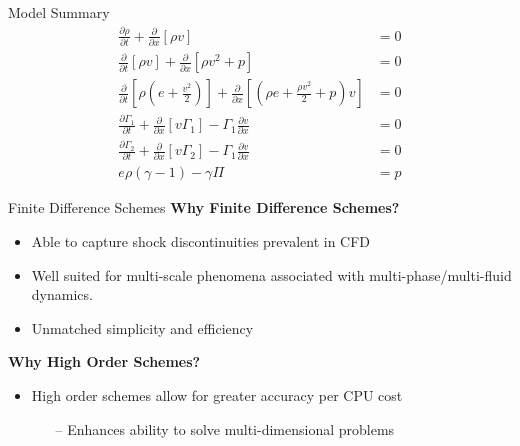 \documentclass[10pt]{beamer}
\begin{document}
\begin{frame}{Model Summary}
  \begin{align}
    \frac{\partial \rho}{\partial t}+\frac{\partial}{\partial x}[\rho v] &=0\label{eq:MassBalance}\\
    \frac{\partial}{\partial t}[\rho v]+\frac{\partial}{\partial x}[\rho v^2+p]&=0\label{eq:MomentaBalance}\\
    \frac{\partial}{\partial t}[\rho(e+\tfrac{v^2}{2})]+\frac{\partial}{\partial x}[(\rho e+\tfrac{\rho v^2}{2} +p)v]&=0\label{eq:EnergyBalance}\\
    \frac{\partial \Gamma_1 }{\partial t} + \frac{\partial}{\partial x}[v\Gamma_1] - \Gamma_1 \frac{\partial v}{\partial x}&=0\label{eq: Order Parameter One}\\
    \frac{\partial \Gamma_2 }{\partial t} + \frac{\partial}{\partial x}[v\Gamma_2] - \Gamma_1 \frac{\partial v}{\partial x}&=0\label{eq: Order Parameter Two}\\
    e\rho(\gamma - 1) -\gamma \Pi &=p
    \end{align} 
\end{frame}







\begin{frame}{Finite Difference Schemes}
\textbf{Why Finite Difference Schemes?}
\begin{itemize}
\item Able to capture shock discontinuities prevalent in CFD
\item Well suited for multi-scale phenomena associated with multi-phase/multi-fluid dynamics.
\item Unmatched simplicity and efficiency
\end{itemize}
\textbf{Why High Order Schemes?}
\begin{itemize}
\item High order schemes allow for greater accuracy per CPU cost \cite{Shahbazi2017,Shahbazi}
\begin{itemize}
\item[--] Enhances ability to solve multi-dimensional problems
\end{itemize}
\end{itemize}
\end{frame}

\end{document}
